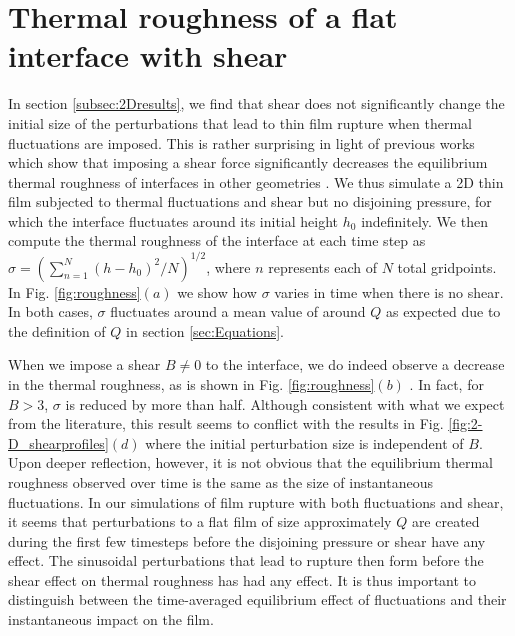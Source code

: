 \documentclass[
 onecolumn,
 amsmath,amssymb,
floatfix,superscriptaddress
]{revtex4-2}
\begin{document}
\section{Thermal roughness of a flat interface with shear}\label{sec:shearroughness}

In section \ref{subsec:2Dresults}, we find that shear does not significantly change the initial size of the perturbations that lead to thin film rupture when thermal fluctuations are imposed. This is rather surprising in light of previous works which show that imposing a shear force significantly decreases the equilibrium thermal roughness of interfaces in other geometries \cite{ThiebaudBickel2015, Derks2006}. We thus simulate a 2D thin film subjected to thermal fluctuations and shear but no disjoining pressure, for which the interface fluctuates around its initial height $h_0$ indefinitely. We then compute the thermal roughness of the interface at each time step as $\sigma = (\sum_{n=1}^{N}(h-h_0)^2/N)^{1/2}$, where $n$ represents each of $N$ total gridpoints. In Fig. \ref{fig:roughness}$(a)$ we show how $\sigma$ varies in time when there is no shear. In both cases, $\sigma$ fluctuates around a mean value of around $Q$ as expected due to the definition of $Q$ in section \ref{sec:Equations}.

When we impose a shear $B \neq 0$ to the interface, we do indeed observe a decrease in the thermal roughness, as is shown in Fig. \ref{fig:roughness}$(b)$ . In fact, for $B >3$, $\sigma$ is reduced by more than half. Although consistent with what we expect from the literature, this result seems to conflict with the results in Fig. \ref{fig:2-D_shearprofiles}$(d)$ where the initial perturbation size is independent of $B$. Upon deeper reflection, however, it is not obvious that the equilibrium thermal roughness observed over time is the same as the size of instantaneous fluctuations. In our simulations of film rupture with both fluctuations and shear, it seems that perturbations to a flat film of size approximately $Q$ are created during the first few timesteps before the disjoining pressure or shear have any effect.  The sinusoidal perturbations that lead to rupture then form before the shear effect on thermal roughness has had any effect. It is thus important to distinguish between the time-averaged equilibrium effect of fluctuations and their instantaneous impact on the film.
\end{document}
